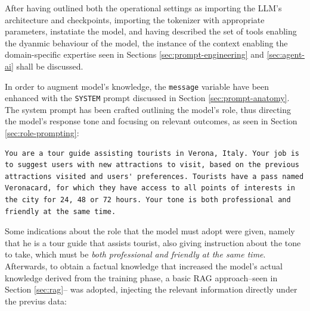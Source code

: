 After having outlined both the operational settings as importing the LLM's architecture and checkpoints, importing the tokenizer with appropriate parameters, instatiate the model, and having described the set of tools enabling the dyanmic behaviour of the model, the instance of the context enabling the domain-specific expertise seen in Sections \ref{sec:prompt-engineering} and \ref{sec:agent-ai} shall be discussed.

In order to augment model's knowledge, the \texttt{message} variable have been enhanced with the \texttt{SYSTEM} prompt discussed in Section \ref{sec:prompt-anatomy}. The system prompt has been crafted outlining the model's role, thus directing the model's response tone and focusing on relevant outcomes, as seen in Section \ref{sec:role-prompting}:

\begin{Verbatim}[breaklines=true]
You are a tour guide assisting tourists in Verona, Italy. Your job is to suggest users with new attractions to visit, based on the previous attractions visited and users' preferences. Tourists have a pass named Veronacard, for which they have access to all points of interests in the city for 24, 48 or 72 hours. Your tone is both professional and friendly at the same time.
\end{Verbatim}

Some indications about the role that the model must adopt were given, namely that he is a tour guide that assists tourist, also giving instruction about the tone to take, which must be \textit{both professional and friendly at the same time}.
Afterwards, to obtain a factual knowledge that increased the model's actual knowledge derived from the training phase, a basic RAG approach--seen in Section \ref{sec:rag}-- was adopted, injecting the relevant information directly under the previus data:

